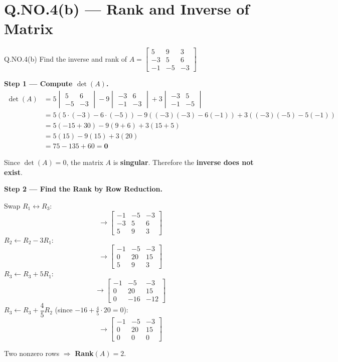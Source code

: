 \documentclass[12pt]{article}
\newcommand{\mat}[1]{\begin{bmatrix}#1\end{bmatrix}}
\begin{document}
\section{Q.NO.4(b) — Rank and Inverse of Matrix}

\begin{qbox}{Q.NO.4(b)}
Find the inverse and rank of $A = \begin{bmatrix}5&9&3\\-3&5&6\\-1&-5&-3\end{bmatrix}$
\end{qbox}

\begin{solbox}

\textbf{Step 1 — Compute $\det(A)$.}
\begin{align*}
  \det(A) &= 5\begin{vmatrix}5&6\\-5&-3\end{vmatrix}
            - 9\begin{vmatrix}-3&6\\-1&-3\end{vmatrix}
            + 3\begin{vmatrix}-3&5\\-1&-5\end{vmatrix} \\[6pt]
          &= 5(5\cdot(-3) - 6\cdot(-5)) - 9((-3)(-3) - 6(-1)) + 3((-3)(-5) - 5(-1)) \\[4pt]
          &= 5(-15+30) - 9(9+6) + 3(15+5) \\[4pt]
          &= 5(15) - 9(15) + 3(20) \\[4pt]
          &= 75 - 135 + 60 = \mathbf{0}
\end{align*}

\begin{notebox}
Since $\det(A) = 0$, the matrix $A$ is \textbf{singular}. Therefore the \textbf{inverse does not exist}.
\end{notebox}

\textbf{Step 2 — Find the Rank by Row Reduction.}

Swap $R_1 \leftrightarrow R_3$:
\[
  \to \mat{-1&-5&-3\\-3&5&6\\5&9&3}
\]
$R_2 \leftarrow R_2 - 3R_1$:
\[
  \to \mat{-1&-5&-3\\0&20&15\\5&9&3}
\]
$R_3 \leftarrow R_3 + 5R_1$:
\[
  \to \mat{-1&-5&-3\\0&20&15\\0&-16&-12}
\]
$R_3 \leftarrow R_3 + \dfrac{4}{5}R_2$ \quad (since $-16 + \tfrac{4}{5}\cdot20 = 0$):
\[
  \to \mat{-1&-5&-3\\0&20&15\\0&0&0}
\]

Two nonzero rows $\Rightarrow$ \textbf{Rank}$(A) = 2$.
\end{solbox}
\end{document}
